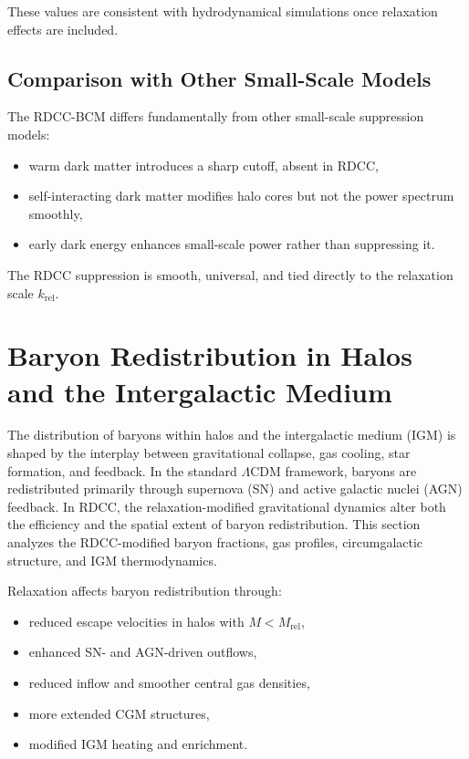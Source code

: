 \documentclass[11pt,a4paper]{article}
\begin{document}
These values are consistent with hydrodynamical simulations once relaxation effects are
included.

\subsection{Comparison with Other Small-Scale Models}

The RDCC-BCM differs fundamentally from other small-scale suppression models:
\begin{itemize}
\item warm dark matter introduces a sharp cutoff, absent in RDCC,
\item self-interacting dark matter modifies halo cores but not the power spectrum smoothly,
\item early dark energy enhances small-scale power rather than suppressing it.
\end{itemize}

The RDCC suppression is smooth, universal, and tied directly to the relaxation scale
$k_{\mathrm{rel}}$.

\section{Baryon Redistribution in Halos and the Intergalactic Medium}

The distribution of baryons within halos and the intergalactic medium (IGM) is shaped by
the interplay between gravitational collapse, gas cooling, star formation, and feedback. In
the standard $\Lambda$CDM framework, baryons are redistributed primarily through supernova
(SN) and active galactic nuclei (AGN) feedback. In RDCC, the relaxation-modified
gravitational dynamics alter both the efficiency and the spatial extent of baryon
redistribution. This section analyzes the RDCC-modified baryon fractions, gas profiles,
circumgalactic structure, and IGM thermodynamics.

Relaxation affects baryon redistribution through:
\begin{itemize}
\item reduced escape velocities in halos with $M < M_{\mathrm{rel}}$,
\item enhanced SN- and AGN-driven outflows,
\item reduced inflow and smoother central gas densities,
\item more extended CGM structures,
\item modified IGM heating and enrichment.
\end{itemize}
\end{document}
